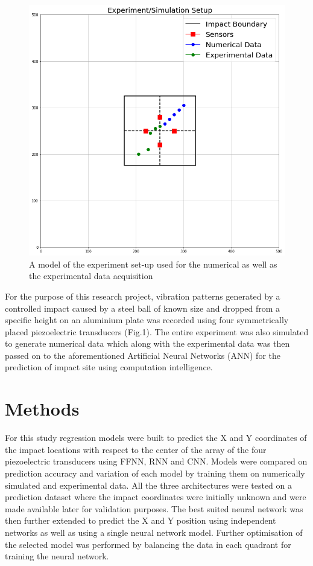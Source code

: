 \documentclass[12pt]{article}
\begin{document}
\begin{figure}[h!]
\begin{center}
\includegraphics[scale=0.4]{"Images/Experimental setup.png"}
\caption{A model of the experiment set-up used for the numerical as well as the experimental data acquisition}
\label{expSetup}
\end{center}
\end{figure}   

\par For the purpose of this research project, vibration patterns generated by a controlled impact caused by a steel ball of known size and dropped from a specific height on an aluminium plate was recorded using four symmetrically placed piezoelectric transducers (Fig.1). The entire experiment was also simulated to generate numerical data which along with the experimental data was then passed on to the aforementioned Artificial Neural Networks (ANN) for the prediction of impact site using computation intelligence.  

\section{Methods}

For this study regression models were built to predict the X and Y coordinates of the impact locations with respect to the center of the array of the four piezoelectric transducers using FFNN, RNN and CNN. Models were compared on prediction accuracy and variation of each model by training them on numerically simulated and experimental data. All the three architectures were tested on a prediction dataset where the impact coordinates were initially unknown and were made available later for validation purposes. The best suited neural network was then further extended to predict the X and Y position using independent networks as well as using a single neural network model. Further optimisation of the selected model was performed by balancing the data in each quadrant for training the neural network. 
\par
\end{document}
